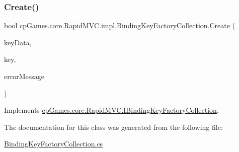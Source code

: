 \subsubsection{\texorpdfstring{Create()}{Create()}}
{\footnotesize\ttfamily bool cp\+Games.\+core.\+Rapid\+M\+V\+C.\+impl.\+Binding\+Key\+Factory\+Collection.\+Create (\begin{DoxyParamCaption}\item[{object}]{key\+Data,  }\item[{out \mbox{\hyperlink{interfacecp_games_1_1core_1_1_rapid_m_v_c_1_1_i_binding_key}{I\+Binding\+Key}}}]{key,  }\item[{out string}]{error\+Message }\end{DoxyParamCaption})}



Implements \mbox{\hyperlink{interfacecp_games_1_1core_1_1_rapid_m_v_c_1_1_i_binding_key_factory_collection_a0e768b4fdf7855f5b5f9b7ac0c1865c8}{cp\+Games.\+core.\+Rapid\+M\+V\+C.\+I\+Binding\+Key\+Factory\+Collection}}.



The documentation for this class was generated from the following file\+:\begin{DoxyCompactItemize}
\item 
\mbox{\hyperlink{_binding_key_factory_collection_8cs}{Binding\+Key\+Factory\+Collection.\+cs}}\end{DoxyCompactItemize}
